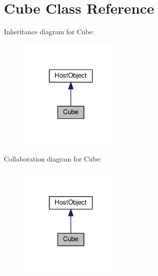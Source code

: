 \hypertarget{class_cube}{}\section{Cube Class Reference}
\label{class_cube}


Inheritance diagram for Cube\+:
\nopagebreak
\begin{figure}[H]
\begin{center}
\leavevmode
\includegraphics[width=146pt]{class_cube__inherit__graph}
\end{center}
\end{figure}


Collaboration diagram for Cube\+:
\nopagebreak
\begin{figure}[H]
\begin{center}
\leavevmode
\includegraphics[width=146pt]{class_cube__coll__graph}
\end{center}
\end{figure}
